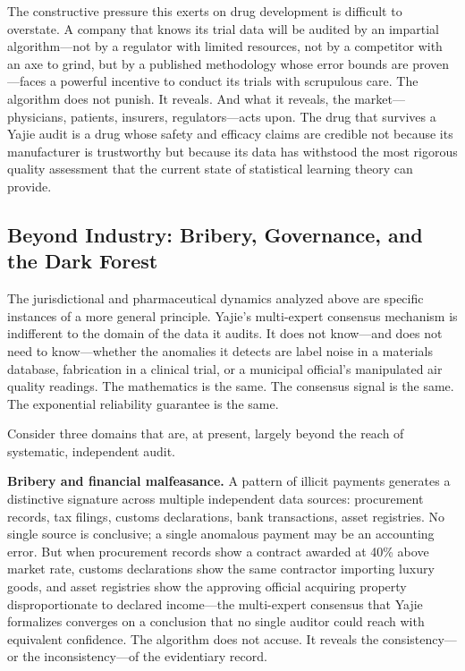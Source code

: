 \documentclass[12pt,a4paper]{article}
\theoremstyle{definition}
\theoremstyle{remark}
\begin{document}
The constructive pressure this exerts on drug development is difficult to overstate. A company that knows its trial data will be audited by an impartial algorithm—not by a regulator with limited resources, not by a competitor with an axe to grind, but by a published methodology whose error bounds are proven—faces a powerful incentive to conduct its trials with scrupulous care. The algorithm does not punish. It reveals. And what it reveals, the market—physicians, patients, insurers, regulators—acts upon. The drug that survives a Yajie audit is a drug whose safety and efficacy claims are credible not because its manufacturer is trustworthy but because its data has withstood the most rigorous quality assessment that the current state of statistical learning theory can provide.

\subsection{Beyond Industry: Bribery, Governance, and the Dark Forest}

The jurisdictional and pharmaceutical dynamics analyzed above are specific instances of a more general principle. Yajie's multi-expert consensus mechanism is indifferent to the domain of the data it audits. It does not know—and does not need to know—whether the anomalies it detects are label noise in a materials database, fabrication in a clinical trial, or a municipal official's manipulated air quality readings. The mathematics is the same. The consensus signal is the same. The exponential reliability guarantee is the same.

Consider three domains that are, at present, largely beyond the reach of systematic, independent audit.

\textbf{Bribery and financial malfeasance.} A pattern of illicit payments generates a distinctive signature across multiple independent data sources: procurement records, tax filings, customs declarations, bank transactions, asset registries. No single source is conclusive; a single anomalous payment may be an accounting error. But when procurement records show a contract awarded at 40\% above market rate, customs declarations show the same contractor importing luxury goods, and asset registries show the approving official acquiring property disproportionate to declared income—the multi-expert consensus that Yajie formalizes converges on a conclusion that no single auditor could reach with equivalent confidence. The algorithm does not accuse. It reveals the consistency—or the inconsistency—of the evidentiary record.
\end{document}
